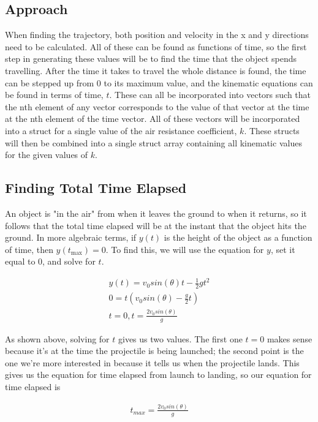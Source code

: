 \documentclass[oneside]{article}
\begin{document}
\subsection{Approach}
When finding the trajectory, both position and velocity in the x and y directions need to be calculated. All of these can be found as functions of time, so the first step in generating these values will be to find the time that the object spends travelling. After the time it takes to travel the whole distance is found, the time can be stepped up from 0 to its maximum value, and the kinematic equations can be found in terms of time, $t$. These can all be incorporated into vectors such that the nth element of any vector corresponds to the value of that vector at the time at the nth element of the time vector. All of these vectors will be incorporated into a struct for a single value of the air resistance coefficient, $k$. These structs will then be combined into a single struct array containing all kinematic values for the given values of $k$.

\subsection{Finding Total Time Elapsed}
An object is "in the air" from when it leaves the ground to when it returns, so it follows that the total time elapsed will be at the instant that the object hits the ground. In more algebraic terms, if $y(t)$ is the height of the object as a function of time, then $y(t_\textrm{max}) = 0$. To find this, we will use the equation for $y$, set it equal to 0, and solve for $t$.

\begin{align*}
    y(t) = v_0sin(\theta)t - \frac{1}{2}gt^2\\
    0 = t(v_0sin(\theta) - \frac{g}{2}t)\\
    t = 0, t = \frac{2v_0sin(\theta)}{g}
\end{align*}

As shown above, solving for $t$ gives us two values. The first one $t=0$ makes sense because it's at the time the projectile is being launched; the second point is the one we're more interested in because it tells us when the projectile lands. This gives us the equation for time elapsed from launch to landing, so our equation for time elapsed is 

\begin{align}
    t_{max} = \frac{2v_0sin(\theta)}{g}
\end{align}
\end{document}
